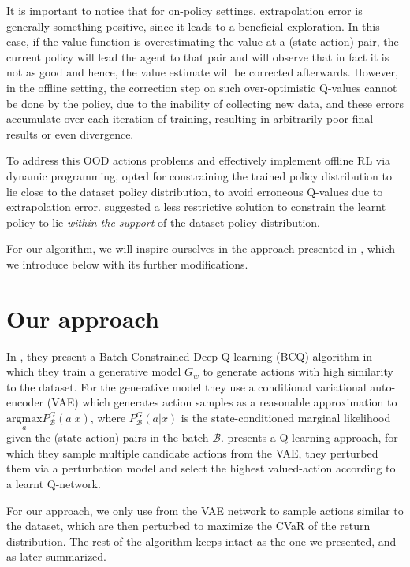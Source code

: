 It is important to notice that for on-policy settings, extrapolation error is generally something positive, since it
leads to a beneficial exploration. In this case, if the value function is overestimating the value at
a (state-action) pair, the current policy will lead the agent to that pair and will observe that in fact
it is not as good and hence, the value estimate will be corrected afterwards.
However, in the offline setting, the correction step on such over-optimistic Q-values cannot be done by the 
policy, due to the inability of collecting new data, and these errors accumulate over each iteration of training,
resulting in arbitrarily poor final results or even divergence.


To address this OOD actions problems and effectively implement offline RL via dynamic programming,
\citet{Fujimoto2018} opted for constraining the trained policy distribution to lie close to
the dataset policy distribution, to avoid erroneous Q-values due to extrapolation error.
\citet{Kumar2019} suggested a less restrictive solution to constrain the learnt policy to lie
\textit{within the support} of the dataset policy distribution.

For our algorithm, we will inspire ourselves in the approach presented in 
\citet{Fujimoto2019}, which we introduce below with its further modifications.


\section{Our approach} 
In \citet{Fujimoto2019}, they present a Batch-Constrained Deep Q-learning (BCQ)
algorithm in which they
train a generative model $G_w$ to generate actions with high similarity to the dataset.
For the generative model they use a conditional variational auto-encoder (VAE) \cite{Kingma2014} which
generates action samples as a reasonable approximation to
$\underset{a}{\text{argmax}}  P _\mathcal{B}^G(a|x)$, where $P_\mathcal{B}^G(a|x)$ is 
the state-conditioned marginal likelihood given the (state-action) pairs in the 
batch $\mathcal{B}$.
\citet{Fujimoto2019} presents a Q-learning approach, for which
they sample multiple candidate actions from the VAE, they perturbed them via a perturbation model
and select the highest valued-action 
according to a learnt Q-network.

For our approach, we only use from \citet{Fujimoto2018} the VAE network to sample actions similar to
the dataset, which are then perturbed to maximize the CVaR of the return distribution.
The rest of the algorithm keeps intact as the one we presented, and as later summarized.

